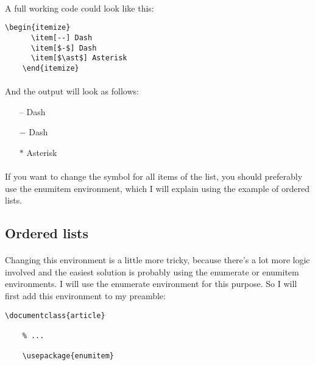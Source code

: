   \paragraph{}
  A full working code could look like this:
  \begin{lstlisting}[language={[LaTeX]TeX},breaklines=true,frame=single]
    \begin{itemize}
      \item[--] Dash
      \item[$-$] Dash
      \item[$\ast$] Asterisk
    \end{itemize}
  \end{lstlisting}
  \paragraph{}
  And the output will look as follows:
  \begin{itemize}
    \item[--] Dash
    \item[$-$] Dash
    \item[$\ast$] Asterisk
  \end{itemize}
  \paragraph{}
  If you want to change the symbol for all items of the list, you should preferably use the enumitem environment, which I will explain using the example of ordered lists.

  
  \subsection{Ordered lists}
  \paragraph{}
  Changing this environment is a little more tricky, because there's a lot more logic involved and the easiest solution is probably using the enumerate or enumitem environments. I will use the enumerate environment for this purpose. So I will first add this environment to my preamble:
  \begin{lstlisting}[language={[LaTeX]TeX},breaklines=true,frame=single]
    \documentclass{article}

    % ...
    
    \usepackage{enumitem}
    
    
  \end{lstlisting}
